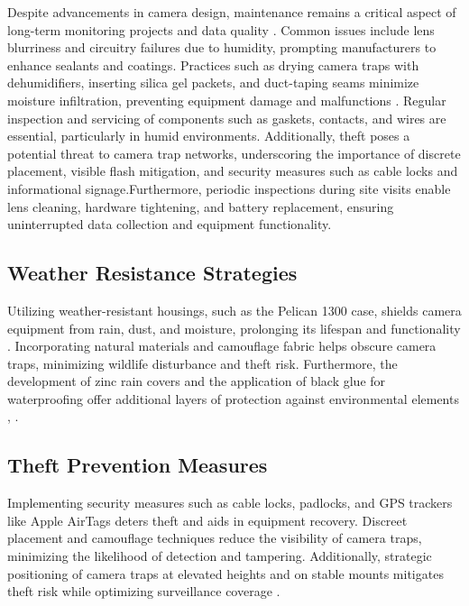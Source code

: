 \documentclass[class=report,11pt,crop=false]{standalone}
\begin{document}
Despite advancements in camera design, maintenance remains a critical aspect of long-term monitoring projects and data quality \cite{kays2009camera}. Common issues include lens blurriness and circuitry failures due to humidity, prompting manufacturers to enhance sealants and coatings. Practices such as drying camera traps with dehumidifiers, inserting silica gel packets, and duct-taping seams minimize moisture infiltration, preventing equipment damage and malfunctions \cite{glover2019camera}.  Regular inspection and servicing of components such as gaskets, contacts, and wires are essential, particularly in humid environments. Additionally, theft poses a potential threat to camera trap networks, underscoring the importance of discrete placement, visible flash mitigation, and security measures such as cable locks and informational signage.Furthermore, periodic inspections during site visits enable lens cleaning, hardware tightening, and battery replacement, ensuring uninterrupted data collection and equipment functionality. 

 
\subsection{Weather Resistance Strategies}

Utilizing weather-resistant housings, such as the Pelican 1300 case, shields camera equipment from rain, dust, and moisture, prolonging its lifespan and functionality \cite{kays2009camera}. Incorporating natural materials and camouflage fabric helps obscure camera traps, minimizing wildlife disturbance and theft risk. Furthermore, the development of zinc rain covers and the application of black glue for waterproofing offer additional layers of protection against environmental elements \cite{kays2009camera}, \cite{glover2019camera}. 


\subsection{Theft Prevention Measures} 

Implementing security measures such as cable locks, padlocks, and GPS trackers like Apple AirTags deters theft and aids in equipment recovery. Discreet placement and camouflage techniques reduce the visibility of camera traps, minimizing the likelihood of detection and tampering. Additionally, strategic positioning of camera traps at elevated heights and on stable mounts mitigates theft risk while optimizing surveillance coverage \cite{kays2009camera}. 
\end{document}
